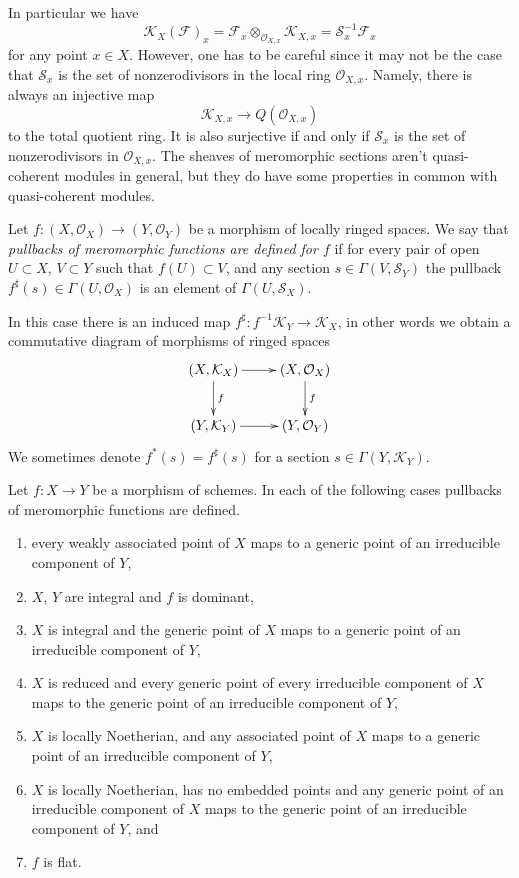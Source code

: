\noindent
In particular we have
$$
\mathcal{K}_X(\mathcal{F})_x
=
\mathcal{F}_x \otimes_{\mathcal{O}_{X, x}} \mathcal{K}_{X, x}
=
\mathcal{S}_x^{-1}\mathcal{F}_x
$$
for any point $x \in X$. However, one has to be careful since it may
not be the case that $\mathcal{S}_x$ is the set of nonzerodivisors
in the local ring $\mathcal{O}_{X, x}$. Namely, there is always
an injective map
$$
\mathcal{K}_{X, x} \longrightarrow Q(\mathcal{O}_{X, x})
$$
to the total quotient ring. It is also surjective if and only if
$\mathcal{S}_x$ is the set of nonzerodivisors in $\mathcal{O}_{X, x}$.
The sheaves of meromorphic sections aren't quasi-coherent
modules in general, but they do have some properties in common
with quasi-coherent modules.

\begin{definition}
\label{definition-pullback-meromorphic-sections}
Let $f : (X, \mathcal{O}_X) \to (Y, \mathcal{O}_Y)$ be a morphism
of locally ringed spaces. We say that {\it pullbacks of meromorphic
functions are defined for $f$} if for every pair of open
$U \subset X$, $V \subset Y$ such that $f(U) \subset V$, and any
section $s \in \Gamma(V, \mathcal{S}_Y)$ the pullback
$f^\sharp(s) \in \Gamma(U, \mathcal{O}_X)$ is an element
of $\Gamma(U, \mathcal{S}_X)$.
\end{definition}

\noindent
In this case there is an induced map
$f^\sharp : f^{-1}\mathcal{K}_Y \to \mathcal{K}_X$,
in other words we obtain a commutative diagram of morphisms
of ringed spaces
$$
\xymatrix{
(X, \mathcal{K}_X) \ar[r] \ar[d]^f &
(X, \mathcal{O}_X) \ar[d]^f \\
(Y, \mathcal{K}_Y) \ar[r] &
(Y, \mathcal{O}_Y)
}
$$
We sometimes denote $f^*(s) = f^\sharp(s)$ for a
section $s \in \Gamma(Y, \mathcal{K}_Y)$.

\begin{lemma}
\label{lemma-pullback-meromorphic-sections-defined}
Let $f : X \to Y$ be a morphism of schemes.
In each of the following cases pullbacks of meromorphic
functions are defined.
\begin{enumerate}
\item every weakly associated point of $X$ maps to
a generic point of an irreducible component of $Y$,
\item $X$, $Y$ are integral and $f$ is dominant,
\item $X$ is integral and the generic point of $X$ maps
to a generic point of an irreducible component of $Y$,
\item $X$ is reduced and every generic point of every irreducible
component of $X$ maps to the generic point of an irreducible component
of $Y$,
\item $X$ is locally Noetherian, and any associated point of
$X$ maps to a generic point of an irreducible component of $Y$,
\item $X$ is locally Noetherian, has no embedded points and
any generic point of an irreducible component of
$X$ maps to the generic point of an irreducible component of $Y$, and
\item $f$ is flat.
\end{enumerate}
\end{lemma}

